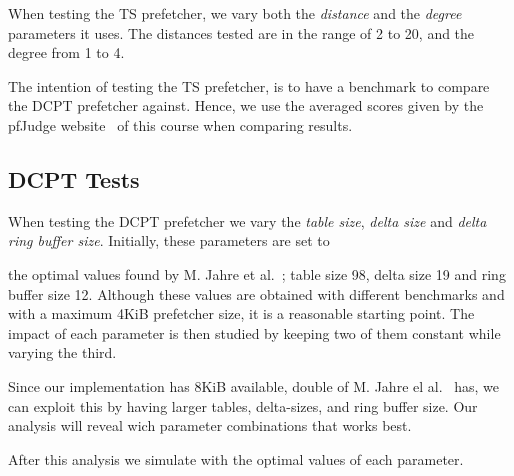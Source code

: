 When testing the TS prefetcher, we vary both the \emph{distance} and the
\emph{degree} parameters it uses. The distances tested are in the range of 2 to
20, and the degree from 1 to 4.

The intention of testing the TS prefetcher, is to have a benchmark to compare
the DCPT prefetcher against. Hence, we use the averaged scores given by the
pfJudge website~\cite[Sec.~2.5]{guidelines} of this course when comparing
results.

\subsection{DCPT Tests}

When testing the DCPT prefetcher we vary the \emph{table size}, \emph{delta
size} and \emph{delta ring buffer size}. Initially, these parameters are set to

the optimal values found by M. Jahre et al.~\cite{dcpt}; table size 98, delta size 19 and ring buffer size 12.
Although these values are obtained with different benchmarks and with a maximum
4KiB prefetcher size, it is a reasonable starting point. The impact of each
parameter is then studied by keeping two of them constant while varying the
third.

Since our implementation has 8KiB available, double of
M. Jahre el al.~\cite{dcpt}
has, we can exploit this by having larger tables, delta-sizes, and ring buffer
size. Our analysis will reveal wich parameter combinations that works best.

After this analysis we simulate with the optimal values of each parameter.

